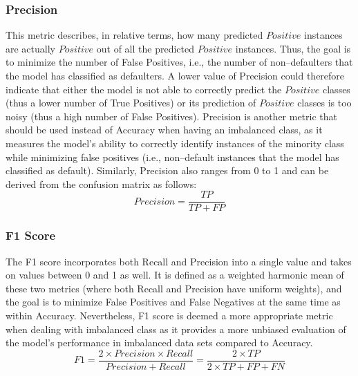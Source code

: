 \newpage
\subsubsection{Precision}
This metric describes, in relative terms, how many predicted $Positive$ instances are actually $Positive$ out of all the predicted $Positive$ instances. Thus, the goal is to minimize the number of False Positives, i.e., the number of non--defaulters that the model has classified as defaulters.
A lower value of Precision could therefore indicate that either the model is not able to correctly predict the $Positive$ classes (thus a lower number of True Positives) or its prediction of $Positive$ classes is too noisy (thus a high number of False Positives).
Precision is another metric that should be used instead of Accuracy when having an imbalanced class, as it measures the model's ability to correctly identify instances of the minority class while minimizing false positives (i.e., non--default instances that the model has classified as default).
Similarly, Precision also ranges from 0 to 1 and can be derived from the confusion matrix as follows:
\begin{equation}\label{eq}
     Precision = \frac{TP}{TP + FP}
\end{equation}
\subsubsection{F1 Score}
The F1 score incorporates both Recall and Precision into a single value and takes on values between 0 and 1 as well.
It is defined as a weighted harmonic mean of these two metrics \citep{brabec2020model} (where both Recall and Precision have uniform weights), and the goal is to minimize False Positives and False Negatives at the same time as within Accuracy.
Nevertheless, F1 score is deemed a more appropriate metric when dealing with imbalanced class as it provides a more unbiased evaluation of the model's performance in imbalanced data sets compared to Accuracy.
\begin{equation}\label{eq}
F1 = \frac{2 \times Precision \times Recall}{Precision + Recall} = \frac{2 \times TP}{2 \times TP + FP + FN}
\end{equation}


\newpage
